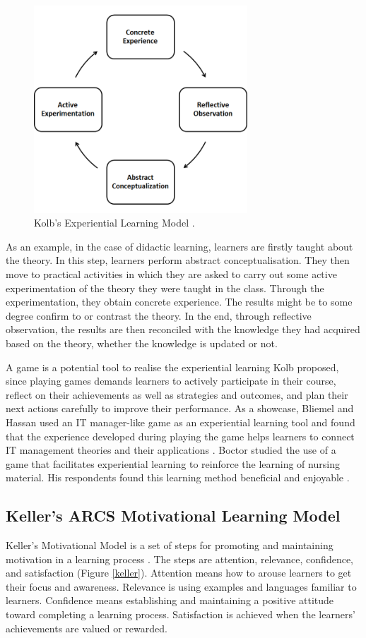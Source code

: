\documentclass[12pt, a4paper]{report}
\begin{document}
\begin{figure}[ht]
\centering
\includegraphics[width=8cm]{kolb}
\caption{Kolb's Experiential Learning Model \cite{kolb2014experiential}.}
\label{kolb}
\end{figure}

As an example, in the case of didactic learning, learners are firstly taught about the theory. In this step, learners perform abstract conceptualisation. They then move to practical activities in which they are asked to carry out some active experimentation of the theory they were taught in the class. Through the experimentation, they obtain concrete experience. The results might be to some degree confirm to or contrast the theory. In the end, through reflective observation, the results are then reconciled with the knowledge they had acquired based on the theory, whether the knowledge is updated or not. 

A game is a potential tool to realise the experiential learning Kolb proposed, since playing games demands learners to actively participate in their course, reflect on their achievements as well as strategies and outcomes, and plan their next actions carefully to improve their performance. As a showcase, Bliemel and Hassan used an IT manager-like game as an experiential learning tool and found that the experience developed during playing the game helps learners to connect IT management theories and their applications \cite{bliemel2014game}. Boctor studied the use of a game that facilitates experiential learning to reinforce the learning of nursing material. His respondents found this learning method beneficial and enjoyable \cite{boctor2013active}. 
 
\subsection{Keller's ARCS Motivational Learning Model}
Keller's Motivational Model is a set of steps for promoting and maintaining motivation in a learning process \cite{keller2010motivational}. The steps are attention, relevance, confidence, and satisfaction (Figure \ref{keller}). Attention means how to arouse learners to get their focus and awareness. Relevance is using examples and languages familiar to learners. Confidence means establishing and maintaining a positive attitude toward completing a learning process. Satisfaction is achieved when the learners' achievements are valued or rewarded. 
\end{document}
